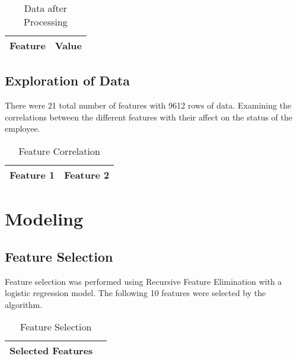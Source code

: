 \documentclass{article} %
\begin{document}
\begin{table}[h]
    \centering
    \caption{Data after Processing}
    \label{tab:after_processing}
    \begin{tabular}{ll}
        \toprule
        Feature & Value \\
        \midrule
        \bottomrule
    \end{tabular}
\end{table}

\subsection{Exploration of Data}

There were 21 total number of features with 9612 rows of data. Examining the correlations between the different features with their affect on the status of the employee.

\begin{table}[h]
    \centering
    \caption{Feature Correlation}
    \label{tab:feature_correlation}
    \begin{tabular}{ll}
        \toprule
        Feature 1 & Feature 2 \\
        \midrule
        \bottomrule
    \end{tabular}
\end{table}

\section{Modeling}

\subsection{Feature Selection}

Feature selection was performed using Recursive Feature Elimination with a logistic regression model. The following 10 features were selected by the algorithm.

\begin{table}[h]
    \centering
    \caption{Feature Selection}
    \label{tab:feature_selection}
    \begin{tabular}{ll}
        \toprule
        Selected Features \\
        \midrule
        \bottomrule
    \end{tabular}
\end{table}
\end{document}
